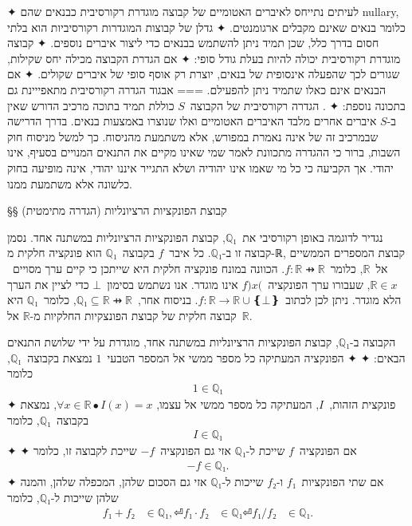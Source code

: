 ✦ לעיתים נתייחס לאיברים האטומיים של קבוצה מוגדרת רקורסיבית כבנאים שהם nullary,
כלומר בנאים שאינם מקבלים ארגומנטים.
✦ גדלן של קבוצות המוגדרות רקורסיביות הוא בלתי חסום בדרך כלל, שכן תמיד ניתן
להשתמש בבנאים כדי ליצור איברים נוספים.
✦ קבוצה מוגדרת רקורסיבית יכולה להיות בעלת גודל סופי:
✦ אם הגדרת הקבוצה מכילה יחס שקילות, שגורים לכך שהפעלה אינסופית של בנאים, יוצרת
רק אוסף סופי של איברים שקולים.
✦ אם הבנאים אינם כאלו שתמיד ניתן להפעילם.
===
{אבגוד}
הגדרה רקורסיבית מתאפייינת גם בתכונה נוספת:
✦ . הגדרה רקורסיבית של הקבוצה~$S$ כוללת תמיד בתוכה מרכיב
הדורש שאין ב-$S$ איברים אחרים מלבד האיברים האטומיים ואלו שנוצרו באמצעות בנאים.
בדרך הדרישה שבמרכיב זה של אינה נאמרת במפורש, אלא משתמעת מהניסוח. כך למשל מניסוח
חוק השבות, ברור כי ההגדרה מתכוונת לאמר שמי שאינו מקיים את התנאים המנויים בסעיף,
אינו יהודי. אך הקביעה כי כל מי שאמו אינו יהודיה ושלא התגייר איננו יהודי, אינה
מופיעה בחוק כלשונה אלא משתמעת ממנו.

§§ קבוצת הפונקציות הרציונליות (הגדרה מתימטית)

נגדיר לדוגמה באופן רקורסיבי את~$ℚ₁$, קבוצת הפונקציות הרציונליות במשתנה אחד.
נסמן קבוצה זו ב-$ℚ₁$. כל איבר~$f$ בקבוצה~$ℚ₁$ הוא פונקציה חלקית מ-ℝ, קבוצת
המספרים הממשיים אל~$ℝ$, כלומר~$f:ℝ⇸ℝ$. הכוונה במונח פונקציה חלקית היא שייתכן כי
קיים ערך מסויים~$ℝ∈x$, שעבורו ערך הפונקציה~$f)x($ אינו מוגדר. אנו נשתמש
בסימון~$⊥$ כדי לציין את הערך הלא מוגדר. ניתן לכן לכתוב~$f:ℝ→ℝ∪❴⊥❵$. בניסוח
אחר,~$ℚ₁⊆ℝ⇸ℝ$, כלומר~$ℚ₁$ היא קבוצה חלקית של קבוצת הפונצקיות החלקיות מ-$ℝ$
אל~$ℝ$.

\label{definition:rationals}
הקבוצה ב-$ℚ₁$, קבוצת הפונקציות הרציונליות במשתנה אחד, מוגדרת על ידי שלושת
התנאים הבאים:
  ✦ 
  ✦ הפונקציה המעתיקה כל מספר ממשי אל המספר הטבעי~$1$ נמצאת בקבוצה~$ℚ₁$, כלומר
  \begin{align}\label{eq:1}
    1∈ℚ₁
  \end{align}
  ✦ פונקצית הזהות,~$I$, המעתיקה כל מספר ממשי אל עצמו,
  $∀ x∈ℝ∙ I(x)=x$,
  נמצאת בקבוצה~$ℚ₁$, כלומר
  \begin{align}\label{eq:x}
    I∈ℚ₁
  \end{align}
  ✦ 
  ✦ אם הפונקציה~$f$ שייכת ל-$ℚ₁$ אזי גם הפונקציה~$-f$ שייכת לקבוצה זו, כלומר
  \begin{align}\label{eq:minus}
    -f∈ℚ₁.
  \end{align}
  ✦ אם שתי הפונקציות~$f₁$ ו-$f₂$ שייכות ל-$ℚ₁$ אזי גם הסכום שלהן, המכפלה
  שלהן, והמנה שלהן שייכות ל-$ℚ₁$, כלומר
  \begin{align}
    f₁+f₂ &∈ℚ₁, \label{eq:plus} ⏎
    f₁·f₂ &∈ℚ₁ \label{eq:times} ⏎
    f₁/f₂ &∈ℚ₁. \label{eq:div}
  \end{align}

